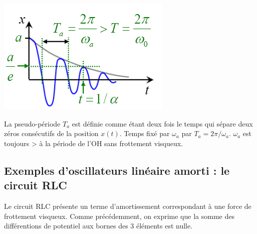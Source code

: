 \documentclass	[11pt, a4paper, openany]{book}
\begin{document}
\begin{center}
\includegraphics[scale=0.45]{oo/image8.png}
\end{center}
La pseudo-période $T_a$ est définie comme étant deux fois le temps qui sépare deux zéros consécutifs de la position $x(t)$. Temps fixé par $\omega_a$ par $T_a = 2\pi/\omega_a$. $\omega_a$ est toujours > à la période de l'OH sans frottement visqueux.

\subsection{Exemples d'oscillateurs linéaire amorti : le circuit RLC}
Le circuit RLC présente un terme d'amortissement correspondant à une force de frottement visqueux. Comme précédemment, on exprime que la somme des différentions de potentiel aux bornes des 3 éléments est nulle.
\end{document}
